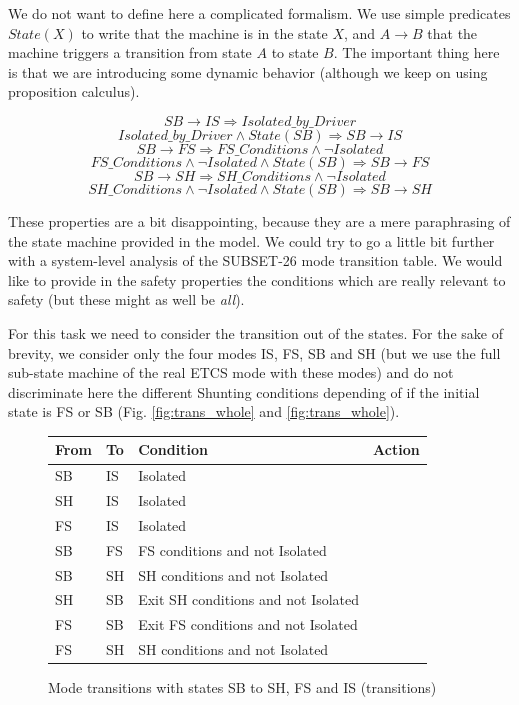 \documentclass{template/openetcs_article}
\def\implies{\Rightarrow}
\begin{document}
We do not want to define here a complicated formalism. We use simple predicates
$State(X)$ to write that the machine is in the state $X$, and $A\rightarrow B$ that the machine triggers
a transition from state $A$ to state $B$. The important thing here is that we are introducing some 
dynamic behavior (although we keep on using proposition calculus).


$$SB\rightarrow IS \implies Isolated\_by\_Driver$$
$$Isolated\_by\_Driver \wedge State(SB) \implies SB\rightarrow IS$$
$$SB\rightarrow FS \implies FS\_Conditions \wedge \neg Isolated$$
$$FS\_Conditions \wedge \neg Isolated \wedge State(SB) \implies SB\rightarrow FS$$
$$SB\rightarrow SH \implies SH\_Conditions \wedge \neg Isolated$$
$$SH\_Conditions \wedge \neg Isolated \wedge State(SB) \implies SB\rightarrow SH $$

These properties are a bit disappointing, because they are a mere paraphrasing of the state machine
provided in the model. We could try to go a little bit further with a system-level analysis of the 
SUBSET-26 mode transition table. We would like to provide in the safety properties the conditions
which are really relevant to safety (but these might as well be \emph{all}).

For this task we need to consider the transition out of the states. 
For the sake of brevity, we consider only the four modes IS, FS, SB and SH (but we use the full sub-state
machine of the real ETCS mode with these modes) and do not discriminate here the different Shunting 
conditions depending of if the initial state is FS or SB (Fig. \ref{fig:trans_whole} and \ref{fig:trans_whole}).

\begin{figure}
 \centering
\small
\begin{tabular}{|l|l||p{3.5cm}|p{3.5cm}|}
\hline
\bf From & \bf To & \bf Condition & \bf Action \\
\hline
SB & IS & Isolated &  \\
\hline
SH & IS & Isolated &  \\
\hline
FS & IS & Isolated &  \\
\hline
SB & FS & FS conditions and not Isolated &  \\
\hline
SB & SH & SH conditions and not Isolated &  \\
\hline
SH & SB & Exit SH conditions and not Isolated &  \\
\hline
FS & SB & Exit FS conditions  and not Isolated &  \\
\hline
FS & SH & SH conditions and not Isolated &  \\
\hline
\end{tabular}
\normalsize
\caption{Mode transitions with states SB to SH, FS and IS (transitions)}
\label{fig:trans_whole_tab}
\end{figure}
\end{document}
